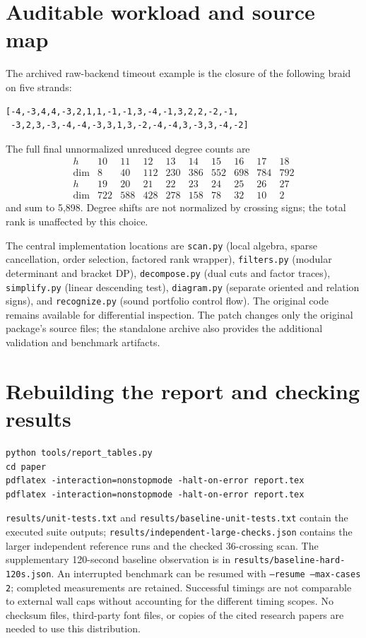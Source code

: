\documentclass[11pt]{article}
\theoremstyle{definition}\newtheorem{definition}[theorem]{Definition}
\theoremstyle{remark}\newtheorem{remark}[theorem]{Remark}
\begin{document}
\appendix
\section{Auditable workload and source map}
The archived raw-backend timeout example is the closure of the following braid
on five strands:
\begin{lstlisting}
[-4,-3,4,4,-3,2,1,1,-1,-1,3,-4,-1,3,2,2,-2,-1,
 -3,2,3,-3,-4,-4,-3,3,1,3,-2,-4,-4,3,-3,3,-4,-2]
\end{lstlisting}
The full final unnormalized unreduced degree counts are
\[
\begin{array}{c|rrrrrrrrr}
h&10&11&12&13&14&15&16&17&18\\\hline
\dim&8&40&112&230&386&552&698&784&792\\[2pt]
h&19&20&21&22&23&24&25&26&27\\\hline
\dim&722&588&428&278&158&78&32&10&2
\end{array}
\]
and sum to 5,898. Degree shifts are not normalized by crossing signs; the total
rank is unaffected by this choice.

The central implementation locations are
\texttt{scan.py} (local algebra, sparse cancellation, order selection, factored
rank wrapper), \texttt{filters.py} (modular determinant and bracket DP),
\texttt{decompose.py} (dual cuts and factor traces), \texttt{simplify.py}
(linear descending test), \texttt{diagram.py} (separate oriented and relation
signs), and \texttt{recognize.py} (sound portfolio control flow).
The original code remains available for differential inspection. The patch
changes only the original package's source files; the standalone archive also
provides the additional validation and benchmark artifacts.

\section{Rebuilding the report and checking results}
\begin{lstlisting}
python tools/report_tables.py
cd paper
pdflatex -interaction=nonstopmode -halt-on-error report.tex
pdflatex -interaction=nonstopmode -halt-on-error report.tex
\end{lstlisting}
\texttt{results/unit-tests.txt} and
\texttt{results/baseline-unit-tests.txt} contain the executed suite outputs;
\texttt{results/independent-large-checks.json} contains the larger independent
reference runs and the checked 36-crossing scan. The supplementary 120-second
baseline observation is in \texttt{results/baseline-hard-120s.json}.
An interrupted benchmark can be resumed with
\texttt{--resume --max-cases 2}; completed measurements are retained.
Successful timings are not comparable to external wall caps without accounting
for the different timing scopes. No checksum files, third-party font files,
or copies of the cited research papers are needed to use this distribution.
\end{document}
